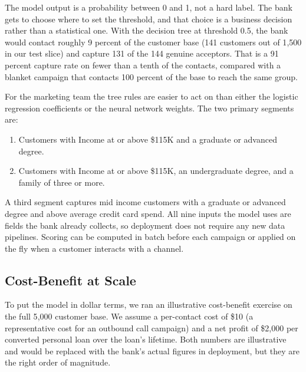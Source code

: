 \documentclass[11pt, a4paper]{article}
\begin{document}
The model output is a probability between 0 and 1, not a hard label. The
bank gets to choose where to set the threshold, and that choice is a
business decision rather than a statistical one. With the decision tree at
threshold 0.5, the bank would contact roughly 9 percent of the customer
base (141 customers out of 1{,}500 in our test slice) and capture 131 of
the 144 genuine acceptors. That is a 91 percent capture rate on fewer
than a tenth of the contacts, compared with a blanket campaign that
contacts 100 percent of the base to reach the same group.

For the marketing team the tree rules are easier to act on than either
the logistic regression coefficients or the neural network weights. The
two primary segments are:

\begin{enumerate}[itemsep=2pt]
    \item Customers with Income at or above \$115K and a graduate or
          advanced degree.
    \item Customers with Income at or above \$115K, an undergraduate
          degree, and a family of three or more.
\end{enumerate}

A third segment captures mid income customers with a graduate or advanced
degree and above average credit card spend. All nine inputs the model uses are
fields the bank already collects, so deployment does not require any new
data pipelines. Scoring can be computed in batch before each campaign or
applied on the fly when a customer interacts with a channel.

\subsection{Cost-Benefit at Scale}

To put the model in dollar terms, we ran an illustrative cost-benefit
exercise on the full 5{,}000 customer base. We assume a per-contact cost
of \$10 (a representative cost for an outbound call campaign) and a net
profit of \$2{,}000 per converted personal loan over the loan's lifetime.
Both numbers are illustrative and would be replaced with the bank's
actual figures in deployment, but they are the right order of magnitude.
\end{document}
